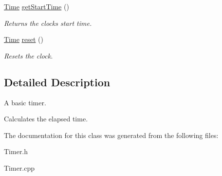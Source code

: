 \begin{DoxyCompactItemize}
\mbox{\hyperlink{class_arcana_1_1_time}{Time}} \mbox{\hyperlink{class_arcana_1_1_timer_a35fb2548a0d576c5265da9093c0f18ef}{get\+Start\+Time}} ()
\begin{DoxyCompactList}\small\item\em Returns the clock\textquotesingle{}s start time. \end{DoxyCompactList}\item 
\mbox{\label{class_arcana_1_1_timer_a4ec8a8a9295d9f45e2c5c7734c64b138}} 
\mbox{\hyperlink{class_arcana_1_1_time}{Time}} \mbox{\hyperlink{class_arcana_1_1_timer_a4ec8a8a9295d9f45e2c5c7734c64b138}{reset}} ()
\begin{DoxyCompactList}\small\item\em Resets the clock. \end{DoxyCompactList}\end{DoxyCompactItemize}


\subsection{Detailed Description}
A basic timer. 

Calculates the elapsed time. 

The documentation for this class was generated from the following files\+:\begin{DoxyCompactItemize}
\item 
Timer.\+h\item 
Timer.\+cpp\end{DoxyCompactItemize}
